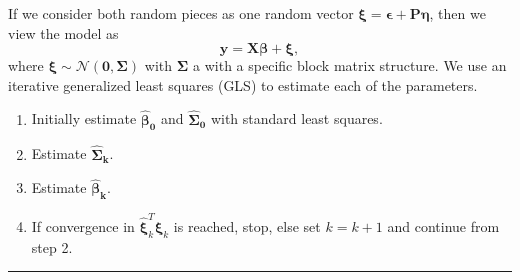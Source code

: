 \documentclass[landscape,a0paper,fontscale=0.285]{baposter} %
\newcommand{\compresslist}{ %
\setlength{\itemsep}{1pt}
\setlength{\parskip}{0pt}
\setlength{\parsep}{0pt}
}
\newcommand{\vect}[1]{\boldsymbol{#1}}
\newcommand{\NN}{\mathcal N}
\begin{document}
\begin{poster}
{If we consider both random pieces as one random vector $\vect \xi = \vect
\epsilon + \vect P\vect \eta$, then we view the model as
\begin{equation}
  \vect y = \vect{X\beta} + \vect \xi, \label{matmodel2}
\end{equation}
where $\vect \xi \sim \NN(\vect 0,\vect \Sigma)$ with $\vect\Sigma$ a with a specific block matrix structure.
We use an iterative generalized least squares (GLS) to estimate each of the parameters.
\begin{enumerate}
  \compresslist
  \item Initially estimate $\vect{\widehat\beta_0}$ and $\vect{\widehat \Sigma_0}$ with standard least squares.
  \item Estimate $\vect {\widehat \Sigma_k}$.  
  \item Estimate $\vect {\widehat \beta_k}$.
  \item If convergence in $\vect{\widehat \xi}_k^T \vect{\widehat \xi}_k$ is reached, stop, else set $k= k+1$ and continue from step 2.
\end{enumerate}
\hrule
\vspace{1em}
}


\end{poster}
\end{document}
